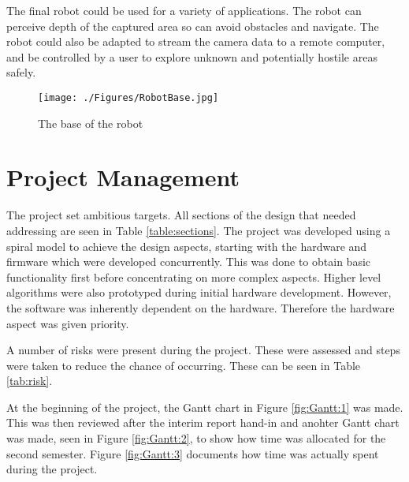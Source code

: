 The final robot could be used for a variety of applications. The robot can perceive depth of the captured area so can avoid obstacles and navigate. The robot could also be adapted to stream the camera data to a remote computer, and be controlled by a user to explore unknown and potentially hostile areas safely. 

\begin{figure}
\centering
\texttt{[image: ./Figures/RobotBase.jpg]}
\caption{The base of the robot}
\label{fig:RobotBase}
\end{figure}

\section{Project Management}


The project set ambitious targets. All sections of the design that needed addressing are seen in Table \ref{table:sections}. The project was developed using a spiral model to achieve the design aspects, starting with the hardware and firmware which were developed concurrently. This was done to obtain basic functionality first before concentrating on more complex aspects. Higher level algorithms were also prototyped during initial hardware development. However, the software was inherently dependent on the hardware. Therefore the hardware aspect was given priority. 

A number of risks were present during the project. These were assessed and steps were taken to reduce the chance of occurring. These can be seen in Table \ref{tab:risk}. 

At the beginning of the project, the Gantt chart in Figure \ref{fig:Gantt:1} was made. This was then reviewed after the interim report hand-in and anohter Gantt chart was made, seen in Figure \ref{fig:Gantt:2}, to show how time was allocated for the second semester. Figure \ref{fig:Gantt:3} documents how time was actually spent during the project. 

